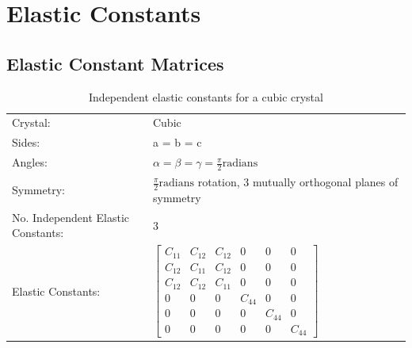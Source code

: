 \chapter{Elastic Constants}
\label{section:elasticconstantsappendix}


\section{Elastic Constant Matrices}

\renewcommand{\arraystretch}{1.7}
\begin{table}[!htbp]
\begin{tabular}{ll}
Crystal: & Cubic \\
Sides: & a = b = c \\
Angles: & $\alpha = \beta = \gamma = \frac{\pi}{2} \text{radians}$ \\
Symmetry: & $\frac{\pi}{2} \text{radians}$ rotation, 3 mutually orthogonal planes of symmetry \\
No. Independent Elastic Constants: & 3  \\
Elastic Constants: & $ \begin{bmatrix} C_{11} & C_{12} & C_{12} & 0 & 0 & 0 \\ C_{12} & C_{11} & C_{12} & 0 & 0 & 0 \\ C_{12} & C_{12} & C_{11} & 0 & 0 & 0 \\ 0 & 0 & 0 & C_{44} & 0 & 0 \\ 0 & 0 & 0 & 0 & C_{44} & 0 \\ 0 & 0 & 0 & 0 & 0 & C_{44} \end{bmatrix} $ \\
\end{tabular}
\label{tab:elasticcubic}
\caption{Independent elastic constants for a cubic crystal\cite{typesofelasticstrain}}
\end{table}


